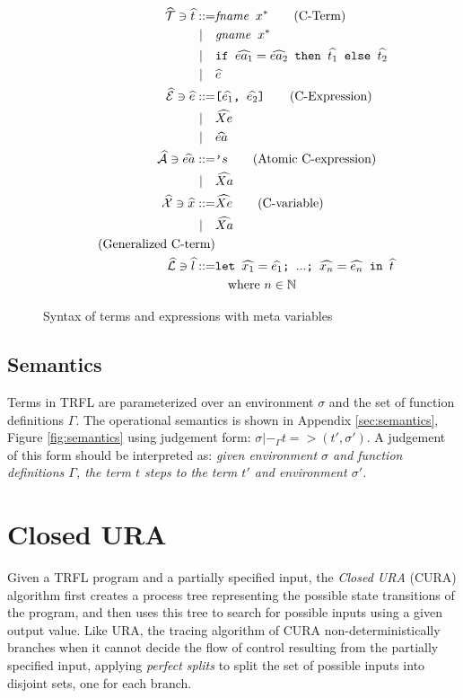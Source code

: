 \documentclass[10pt]{../sigplanconf}
\begin{document}
\begin{figure}\centering
  \begin{align*}
    \widehat{\mathcal{T}} \ni \widehat{t}
      ::=& \texttt{\textit{\rmfamily fname} $x^{*}$} \tag{C-Term} \\
    | \quad & \texttt{\textit{\rmfamily gname} $x^{*}$} \\
    | \quad & \texttt{if $\widehat{ea_1} = \widehat{ea_2}$ then $\widehat{t_1}$ else $\widehat{t_2}$} \\
    | \quad & \widehat{e} \\
    \widehat{\mathcal{E}} \ni \widehat{e} ::=& \texttt{[$\widehat{e_1}$, $\widehat{e_2}$]} \tag{C-Expression} \\
    | \quad & \widehat{Xe} \\
    | \quad & \widehat{ea} \\
    \widehat{\mathcal{A}} \ni \widehat{ea} ::= & \texttt{'}s \tag{Atomic C-expression} \\
    | \quad & \widehat{Xa} \\
    \widehat{\mathcal{X}} \ni \widehat{x} ::= & \widehat{Xe} \tag{C-variable} \\
    | \quad & \widehat{Xa} \\
    \tag{Generalized C-term} \\
    \widehat{\mathcal{L}} \ni \widehat{l} ::= & \texttt{let $\widehat{x_1} = \widehat{e_1}$; $...$; $\widehat{x_n} = \widehat{e_n}$ in $\widehat{t}$} \\
    & \quad \textrm{where}\ n \in \mathbb{N}
  \end{align*}

\caption{Syntax of terms and expressions with meta variables}
\label{fig:cbnf}
\end{figure}

\subsection{Semantics}
Terms in TRFL are parameterized over an environment $\sigma$ and the
set of function definitions $\Gamma$. The operational semantics is
shown in Appendix \ref{sec:semantics}, Figure \ref{fig:semantics}
using judgement form: $\sigma |-_\Gamma t => (t', \sigma')$. A
judgement of this form should be interpreted as: \textit{given
  environment $\sigma$ and function definitions $\Gamma$, the term $t$
  steps to the term $t'$ and environment $\sigma'$.}

\section{Closed URA}
\label{sec:closed-ura}
Given a TRFL program and a partially specified input, the \emph{Closed
  URA} (CURA) algorithm first creates a process tree representing the
possible state transitions of the program, and then uses this tree to
search for possible inputs using a given output value. Like URA, the
tracing algorithm of CURA non-deterministically branches when it
cannot decide the flow of control resulting from the partially
specified input, applying \emph{perfect splits} to split the set of
possible inputs into disjoint sets, one for each branch.
\end{document}
